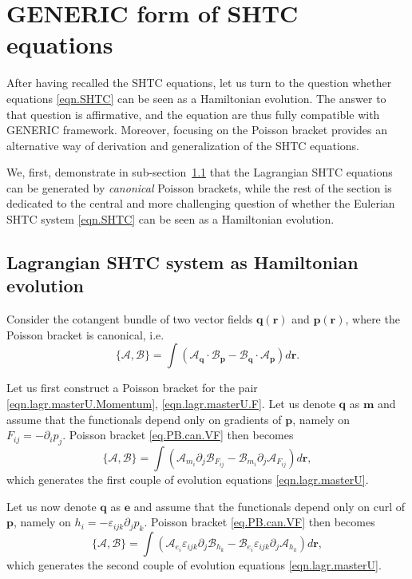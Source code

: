 \documentclass[twoside]{article}
\newcommand{\rr}{{\boldsymbol{r}}}
\newcommand{\mm}{{\boldsymbol{m}}}
\newcommand{\qq}{{\boldsymbol{q}}}
\newcommand{\pp}{{\boldsymbol{p}}}
\newcommand{\ee}{{\boldsymbol{e}}}
\newcommand{\AF}{\mathscr{A}}
\newcommand{\BF}{\mathscr{B}}
\newcommand{\pd}{\partial}
\newcommand{\eps}{\varepsilon}
\begin{document}
\section{GENERIC form of SHTC equations}\label{sec.GENERIC}
After having recalled the SHTC equations, let us turn to the question whether 
equations \eqref{eqn.SHTC} can be seen as a Hamiltonian evolution. The answer 
to that question is affirmative, and the equation are thus fully compatible 
with GENERIC framework. Moreover, focusing on the Poisson bracket provides an 
alternative way of derivation and generalization of the SHTC equations.

We, first, demonstrate in sub-section~\ref{sec.LSHTC.GEN} that the Lagrangian 
SHTC equations can be generated by \textit{canonical} Poisson brackets, while 
the rest of the section is dedicated to the central and more challenging 
question of whether the Eulerian SHTC system \eqref{eqn.SHTC} can be seen as a 
Hamiltonian evolution.

\subsection{Lagrangian SHTC system as Hamiltonian 
evolution}\label{sec.LSHTC.GEN}
Consider the cotangent bundle of two vector fields $\qq(\rr)$ and $\pp(\rr)$, 
where the Poisson bracket is canonical, i.e.
\begin{equation}\label{eq.PB.can.VF}
\{\AF,\BF\}=\int (\AF_\qq \cdot \BF_{\pp}-\BF_\qq \cdot \AF_{\pp}) d\rr.
\end{equation}

Let us first construct a Poisson bracket for the pair 
\eqref{eqn.lagr.masterU.Momentum}, \eqref{eqn.lagr.masterU.F}. Let us denote 
$\qq$ as $\mm$ and assume that the functionals depend only on gradients of 
$\pp$, namely on $F_{ij} = -\pd_i p_j$. Poisson bracket \eqref{eq.PB.can.VF} 
then becomes
\begin{equation}\label{eq.PB.VF.1}
\{\AF,\BF\} = \int (\AF_{m_i} \pd_j \BF_{F_{ij}}-\BF_{m_i} \pd_j \AF_{F_{ij}}) 
d\rr,
\end{equation}
which generates the first couple of evolution equations \eqref{eqn.lagr.masterU}. 

Let us now denote $\qq$ as $\ee$ and assume that the functionals depend only on 
curl of $\pp$, namely on $h_i= -\eps_{ijk}\pd_j p_k$. Poisson bracket 
\eqref{eq.PB.can.VF} then becomes
\begin{equation}\label{eq.PB.VF.2}
\{\AF,\BF\} = \int (\AF_{e_i} \eps_{ijk}\pd_j \BF_{h_k}-\BF_{e_i} 
\eps_{ijk}\pd_j \AF_{h_k}) d\rr,
\end{equation}
which generates the second couple of evolution equations \eqref{eqn.lagr.masterU}. 
\end{document}

